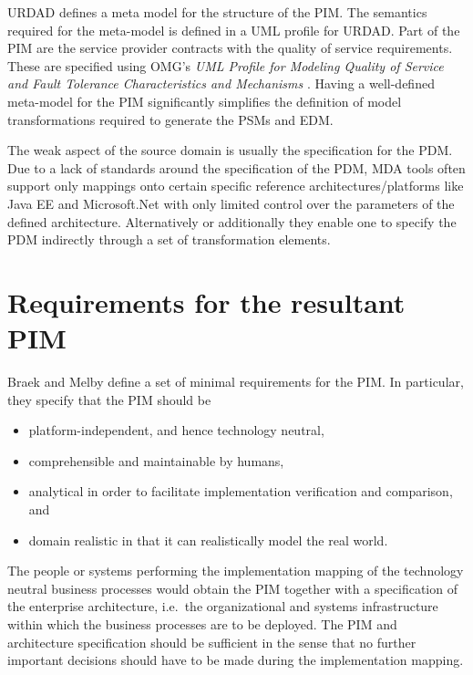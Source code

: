 \documentclass[reviewcopy]{elsart}
\begin{document}
URDAD defines a meta model for the
structure of the PIM. The semantics required for the meta-model is defined in a UML profile for URDAD.
Part of the PIM are the service provider contracts with the quality of service requirements. These are
specified using OMG's {\em UML Profile for Modeling Quality of Service and Fault Tolerance Characteristics
and Mechanisms} \cite{omg:umlProfileQos}. Having a well-defined meta-model for the PIM significantly
simplifies the definition of model transformations required to generate the PSMs and EDM.

The weak aspect of the source domain is usually the specification for the PDM.
Due to a lack of standards around the specification of the PDM, MDA tools often support only
mappings onto certain specific reference architectures/platforms like Java EE and Microsoft.Net
with only limited control over the parameters of the defined architecture. Alternatively
or additionally they enable one to specify the PDM indirectly through a set of transformation
elements.



\section{Requirements for the resultant PIM}
\label{sec:pimRequirements}

Braek and Melby \cite{braek:modelDrivenServiceEngineering} define a set
of minimal requirements for the PIM. In particular, they specify that the
PIM should be
\begin{itemize}
  \item platform-independent, and hence technology neutral,
  \item comprehensible and maintainable by humans,
  \item analytical in order to facilitate implementation verification and
comparison, and
  \item domain realistic in that it can realistically model the real world.
\end{itemize}

The people or systems performing the implementation mapping of the
technology neutral business processes would obtain the PIM together
with a specification of the enterprise architecture, i.e.\ the organizational
and systems infrastructure within which the business processes are to be
deployed. The PIM and architecture specification should be sufficient
in the sense that no further important
decisions should have to be made during the implementation mapping.
\end{document}
